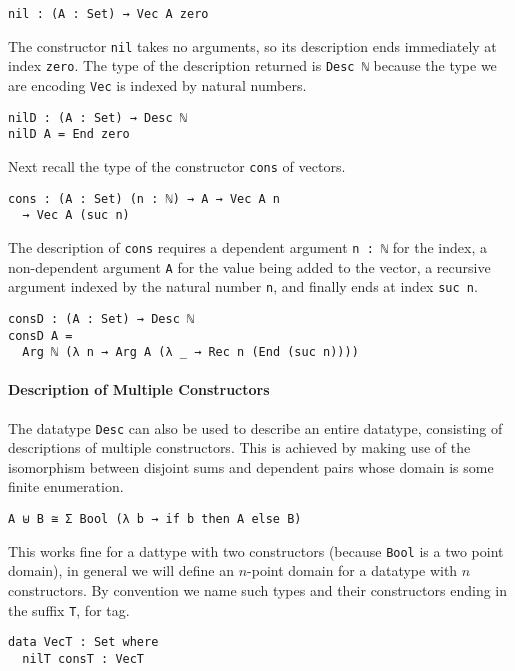 \documentclass[preprint,nonatbib]{sigplanconf}
\begin{document}
\begin{verbatim}
nil : (A : Set) → Vec A zero
\end{verbatim}

The constructor {\tt nil} takes no arguments, so its description
ends immediately at index {\tt zero}. The type of the description
returned is {\tt Desc ℕ} because the type we are encoding {\tt Vec}
is indexed by natural numbers.

\begin{verbatim}
nilD : (A : Set) → Desc ℕ
nilD A = End zero
\end{verbatim}

Next recall the type of the
constructor {\tt cons} of vectors.

\begin{verbatim}
cons : (A : Set) (n : ℕ) → A → Vec A n
  → Vec A (suc n)
\end{verbatim}

The description of {\tt cons} requires a dependent argument
{\tt n : ℕ} for the index, a non-dependent argument {\tt A} for the value
being added to the vector, a recursive argument indexed by the
natural number {\tt n}, and finally ends at index {\tt suc n}.

\begin{verbatim}
consD : (A : Set) → Desc ℕ
consD A =
  Arg ℕ (λ n → Arg A (λ _ → Rec n (End (suc n))))
\end{verbatim}

\paragraph{Description of Multiple Constructors}
\label{sec:background:multiple}

The datatype {\tt Desc} can also be used to describe an entire
datatype, consisting of descriptions of multiple constructors.
This is achieved by making use of the isomorphism between disjoint
sums and dependent pairs whose domain is some finite enumeration.

\begin{verbatim}
A ⊎ B ≅ Σ Bool (λ b → if b then A else B)
\end{verbatim}

This works fine for a dattype with two constructors (because {\tt Bool} is a two point domain),
in general we will define an $n$-point domain for a datatype with $n$ constructors. By
convention we name such types and their constructors ending in the suffix {\tt T}, for tag.

\begin{verbatim}
data VecT : Set where
  nilT consT : VecT
\end{verbatim}
\end{document}
